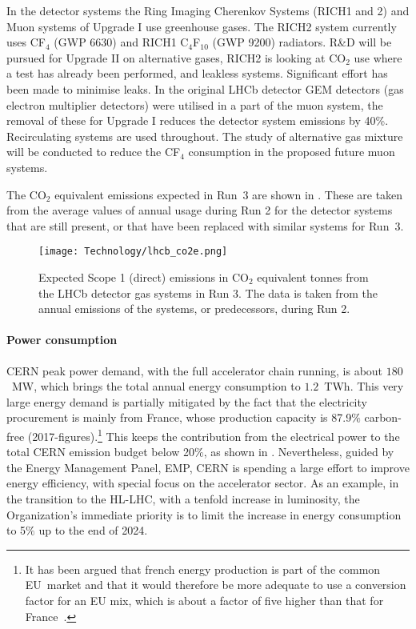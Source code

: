 \documentclass[../SustainableHEP.tex]{subfiles}
\begin{document}
\begin{casestudy}
In the detector systems the Ring Imaging Cherenkov Systems (RICH1 and 2) and Muon systems of Upgrade I use greenhouse gases. The RICH2 system currently uses CF$_4$ (GWP 6630) and RICH1 C$_4$F$_{10}$ (GWP 9200) radiators. R\&D will be pursued for Upgrade II on alternative gases, RICH2 is looking at CO$_2$ use where a test has already been performed, and leakless systems. Significant effort has been made to minimise leaks.  
In the original LHCb detector GEM detectors (gas electron multiplier detectors) were utilised in a part of the muon system, the removal of these for Upgrade I reduces the detector system emissions by 40\%. 
Recirculating systems are used throughout. The study of alternative gas mixture will be conducted to reduce the CF$_4$ consumption in the proposed future muon systems.

The CO$_2$ equivalent emissions expected in Run~3 are shown in . These are taken from the average values of annual usage during Run 2 for the detector systems that are still present, or that have been replaced with similar systems for Run~3. 

\begin{figure}
    \captionsetup{type=figure}
    {\texttt{[image: Technology/lhcb\_co2e.png]}}
    \caption[Expected Scope 1 (direct)  emissions in CO$_2$ equivalent tonnes from the LHCb detector gas systems in Run 3]{Expected Scope 1 (direct)  emissions in CO$_2$ equivalent tonnes from the LHCb detector gas systems in Run 3. The data is taken from the annual emissions of the systems, or predecessors, during Run 2.}\label{fig:LHCbCO2e}
\end{figure}

\paragraph{Power consumption}   %
\label{sec:powerconsumption}
CERN peak power demand, with the full accelerator chain running, is about $180$~MW, which brings the total annual energy consumption to $1.2$~TWh. This very large energy demand is partially mitigated by the fact that the electricity procurement is mainly from France, whose production capacity is 87.9$\%$ carbon-free (2017-figures).\footnote{It has been argued that french energy production is part of the common EU~market and that it would therefore be more adequate to use a conversion factor for an EU mix, which is about a factor of five higher than that for France~\cite{EUmix}.} This keeps the contribution from the electrical power to the total CERN emission budget below 20$\%$, as shown in . Nevertheless, guided by the Energy Management Panel, EMP, CERN is spending a large effort to improve energy efficiency, with special focus on the accelerator sector. As an example, in the transition to the HL-LHC, with a tenfold increase in luminosity, the Organization’s immediate priority is to limit the increase in energy consumption to 5$\%$ up to the end of 2024.
 

\end{casestudy}
\end{document}
